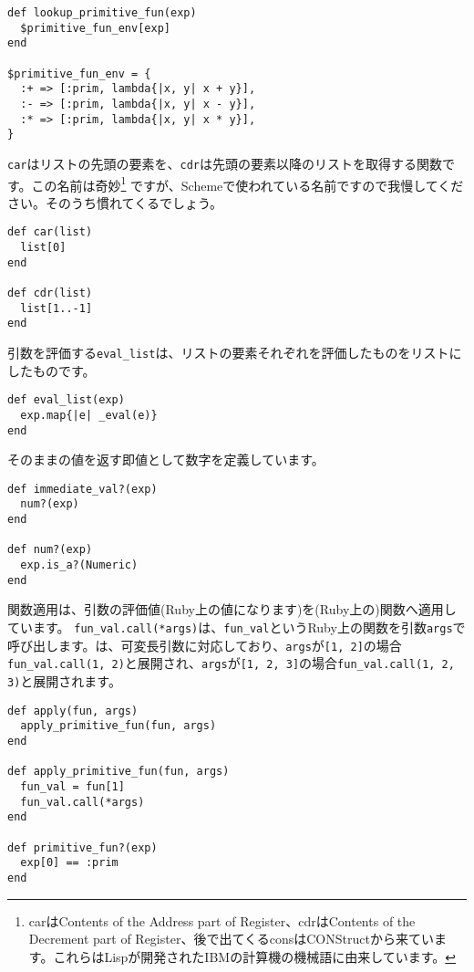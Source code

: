 \begin{lstlisting}
def lookup_primitive_fun(exp)
  $primitive_fun_env[exp]
end

$primitive_fun_env = {
  :+ => [:prim, lambda{|x, y| x + y}],
  :- => [:prim, lambda{|x, y| x - y}],
  :* => [:prim, lambda{|x, y| x * y}], 
}
\end{lstlisting}

{\tt car}はリストの先頭の要素を、{\tt cdr}は先頭の要素以降のリストを取得する関数です。この名前は奇妙\footnote{carはContents of the Address part of Register、cdrはContents of the Decrement part of Register、後で出てくるconsはCONStructから来ています。これらはLispが開発されたIBMの計算機の機械語に由来しています。} ですが、Schemeで使われている名前ですので我慢してください。そのうち慣れてくるでしょう。

\begin{lstlisting}
def car(list)
  list[0]
end

def cdr(list)
  list[1..-1]
end
\end{lstlisting}

引数を評価する{\tt eval\_list}は、リストの要素それぞれを評価したものをリストにしたものです。

\begin{lstlisting}
def eval_list(exp)
  exp.map{|e| _eval(e)}
end    
\end{lstlisting}

そのままの値を返す即値として数字を定義しています。

\begin{lstlisting}
def immediate_val?(exp)
  num?(exp) 
end

def num?(exp)
  exp.is_a?(Numeric)
end
\end{lstlisting}

関数適用は、引数の評価値(Ruby上の値になります)を(Ruby上の)関数へ適用しています。
{\tt fun\_val.call(*args)}は、{\tt fun\_val}というRuby上の関数を引数{\tt args}で呼び出します。{\tt *}は、可変長引数に対応しており、{\tt args}が{\tt [1, 2]}の場合{\tt fun\_val.call(1, 2)}と展開され、{\tt args}が{\tt [1, 2, 3]}の場合{\tt fun\_val.call(1, 2, 3)}と展開されます。

\begin{lstlisting}
def apply(fun, args)
  apply_primitive_fun(fun, args)
end

def apply_primitive_fun(fun, args)
  fun_val = fun[1]
  fun_val.call(*args)
end

def primitive_fun?(exp)
  exp[0] == :prim
end
\end{lstlisting}

